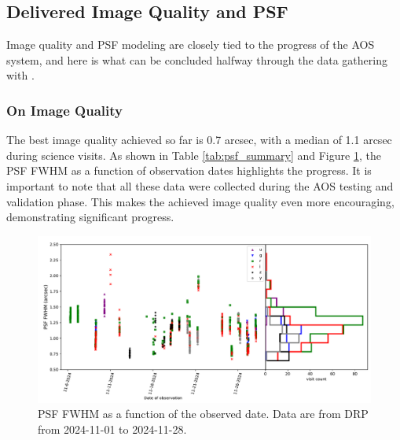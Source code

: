 \subsection{Delivered Image Quality and PSF}
\label{sec:delivered_image_quality_and_psf}


Image quality and PSF modeling are closely tied to the progress of the AOS system, and here is what can be concluded halfway through the data gathering with \ComCam.

\subsubsection{On Image Quality}

The best image quality achieved so far is 0.7 arcsec, with a median of 1.1 arcsec during science visits. As shown in Table \ref{tab:psf_summary} and Figure \ref{seeing_plot}, the PSF FWHM as a function of observation dates highlights the progress. It is important to note that all these data were collected during the AOS testing and validation phase. This makes the achieved image quality even more encouraging, demonstrating significant progress.

\begin{figure}
        \centering
        \includegraphics[width=\textwidth]{figures/seeing}
        \caption{\small PSF FWHM as a function of the observed date. Data are from DRP from 2024-11-01 to 2024-11-28.}
        \label{seeing_plot}
\end{figure}


